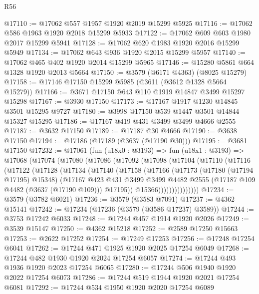 \begin{lexlean}{R56}
\begin{coremodule}
@17110 := @17062 @557 @1957 @1920 @2019 @15299 @5925
@17116 := @17062 @586 @1963 @1920 @2018 @15299 @5933
@17122 := @17062 @609 @603 @1980 @2017 @15299 @5941
@17128 := @17062 @620 @1983 @1920 @2016 @15299 @5949
@17134 := @17062 @643 @936 @1920 @2015 @15299 @5957
@17140 := @17062 @465 @402 @1920 @2014 @15299 @5965
@17146 := @15280 @5861 @664 @1328 @1920 @2013 @5664
@17150 := @3579 (@6171 @4363) (@8025 @15279)
@17158 := @17146 @17150 @15299 @5985 (@3611 (@3612 @1328 @5664 @15279))
@17166 := @3671 @17150 @643 @110 @1919 @14847 @3499 @15297 @15298
@17167 := @3930 @17150
@17173 := @17167 @1917 @1230 @14845 @3501 @15295 @9727
@17180 := @3998 @17150 @539 @1447 @3501 @14844 @15327 @15295
@17186 := @17167 @419 @431 @3499 @3499 @4666 @2555
@17187 := @3632 @17150
@17189 := @17187 @30 @4666
@17190 := @3638 @17150
@17194 := @17186 (@17189 (@3637 (@17190 @30)))
@17195 := @3681 @17150
@17232 := @17061
    (fun (u18x0 : @3193) =>
    fun (u18x1 : @3193) =>
    @17068
      (@17074
        (@17080
          (@17086
            (@17092
              (@17098
                (@17104
                  (@17110
                    (@17116
                      (@17122
                        (@17128
                          (@17134
                            (@17140
                              (@17158
                                (@17166
                                  (@17173
                                    (@17180 (@17194 @17195) @15348)
                                    (@17167
                                      @423
                                      @431
                                      @3499
                                      @3499
                                      @4482
                                      @2555
                                      (@17187 @109 @4482 (@3637 (@17190 @109)))
                                      @17195))
                                  @15366)))))))))))))))
@17234 := @3579 (@3782 @6021)
@17236 := @3579 (@3583 @7091)
@17237 := @4362 @15141
@17242 := @17234 (@17236 (@3579 (@3586 @17237) @3589))
@17244 := @3753 @17242 @6033
@17248 := @17244 @457 @1914 @1920 @2026
@17249 := @3539 @15147
@17250 := @4362 @15218
@17252 := @2589 @17250 @15663
@17253 := @2622 @17252
@17254 := @17249 @17253
@17256 := @17248 @17254 @6041
@17262 := @17244 @471 @1925 @1920 @2025 @17254 @6049
@17268 := @17244 @482 @1930 @1920 @2024 @17254 @6057
@17274 := @17244 @493 @1936 @1920 @2023 @17254 @6065
@17280 := @17244 @506 @1940 @1920 @2022 @17254 @6073
@17286 := @17244 @519 @1944 @1920 @2021 @17254 @6081
@17292 := @17244 @534 @1950 @1920 @2020 @17254 @6089

\end{coremodule}
\end{lexlean}

